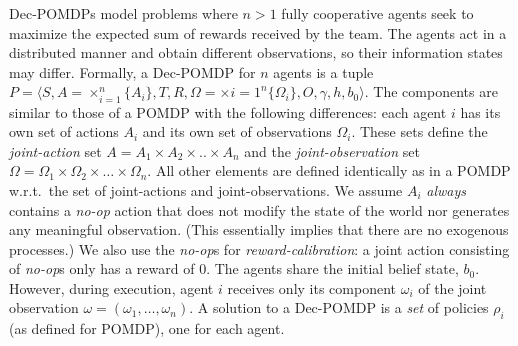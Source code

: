 \documentclass[runningheads]{llncs}
\begin{document}
Dec-POMDPs model problems where $n>1$ fully cooperative agents  seek to maximize the expected sum of rewards received by the team. The agents act in a distributed manner and obtain
different observations, so their information states may differ.
Formally, a Dec-POMDP for $n$ agents is a tuple  $P=\langle S, A=\times_{i=1}^{n}{\{A_i\}}, T, R, \Omega=\times{i=1}^{n}{\{\Omega_i\}},  O, \gamma, h,b_0\rangle$.
The components are similar to those of 
a POMDP with the following differences: each agent $i$ has its own
set of actions $A_i$ and its own set of observations $\Omega_i$. These sets define the {\em joint-action} set
$A=A_1 \times A_2 \times .. \times A_n$ and the 
{\em joint-observation} set $\Omega = \Omega_1 \times \Omega_2 \times
\ldots\times \Omega_n$. All other elements are defined identically as in a POMDP w.r.t.~the set of joint-actions and joint-observations.
We assume  $A_i$ {\em always} contains a {\em no-op} action that does not modify the state of the world nor generates any meaningful observation. (This essentially implies that there are no exogenous processes.) We also
use the  {\em no-op}s for {\em reward-calibration}: a joint action consisting of {\em no-op}s only has a reward of 0. 
The agents share the initial belief state, $b_0$. However, during
execution, agent $i$ receives only its component $\omega_i$ of the joint observation $\omega = (\omega_1,\ldots,\omega_n)$. 
A solution to a Dec-POMDP is a \emph{set} of policies $\rho_i$ (as defined for POMDP), one for each agent.
\end{document}
